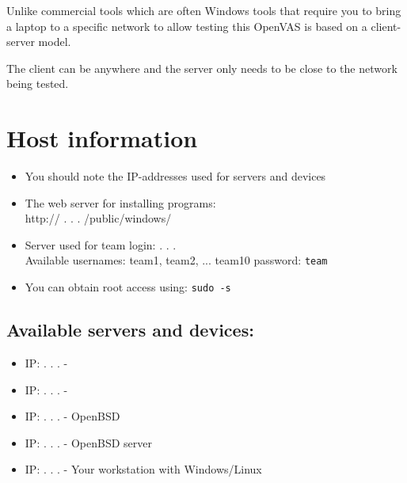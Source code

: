 \documentclass[a4paper,11pt,notitlepage]{report}
\begin{document}
Unlike commercial tools which are often Windows tools that require you to bring a laptop
to a specific network to allow testing this OpenVAS is based on a client-server model.

The client can be anywhere and the server only needs to be close to the network being tested.



\appendix
\rhead{\fancyplain{}{\bf \leftmark}}

\normal

\chapter{\color{titlecolor}Host information}

\begin{itemize}
\item You should note the IP-addresses used for servers and devices
\item The web server for installing programs:\\
http:// \hskip 15mm .\hskip 15mm .\hskip 15mm .\hskip 15mm
/public/windows/
\item Server used for team login: \hskip 15mm .\hskip 15mm .\hskip 15mm .\hskip 15mm \\
Available usernames: team1, team2, ... team10
password: \verb+team+
\item You can obtain root access using: \verb+sudo -s+
\end{itemize}

\section*{\color{titlecolor}Available servers and devices:}
\begin{itemize}
\item IP: \hskip 15mm .\hskip 15mm .\hskip 15mm .\hskip 15mm -
\item IP: \hskip 15mm .\hskip 15mm .\hskip 15mm .\hskip 15mm -
\item IP: \hskip 15mm .\hskip 15mm .\hskip 15mm .\hskip 15mm -
  OpenBSD
\item IP: \hskip 15mm .\hskip 15mm .\hskip 15mm .\hskip 15mm -
  OpenBSD server
\item IP: \hskip 15mm .\hskip 15mm .\hskip 15mm .\hskip 15mm - Your workstation with Windows/Linux
\end{itemize}



%



\end{document}
